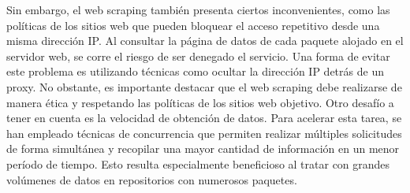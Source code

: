 Sin embargo, el web scraping también presenta ciertos inconvenientes, como las políticas de los sitios web que pueden bloquear el acceso repetitivo desde una misma dirección IP. Al consultar la página de datos de cada paquete alojado en el servidor web, se corre el riesgo de ser denegado el servicio. Una forma de evitar este problema es utilizando técnicas como ocultar la dirección IP detrás de un proxy. No obstante, es importante destacar que el web scraping debe realizarse de manera ética y respetando las políticas de los sitios web objetivo.
Otro desafío a tener en cuenta es la velocidad de obtención de datos. Para acelerar esta tarea, se han empleado técnicas de concurrencia que permiten realizar múltiples solicitudes de forma simultánea y recopilar una mayor cantidad de información en un menor período de tiempo. Esto resulta especialmente beneficioso al tratar con grandes volúmenes de datos en repositorios con numerosos paquetes.
